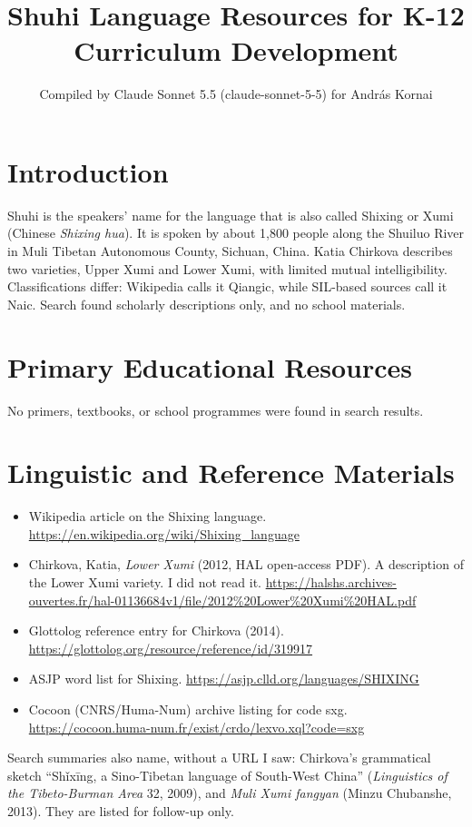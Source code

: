 \documentclass[12pt]{article}
\title{Shuhi Language Resources for K-12 Curriculum Development}
\author{Compiled by Claude Sonnet 5.5 (claude-sonnet-5-5) for Andr\'as Kornai}
\date{}
\begin{document}
\maketitle

\section{Introduction}
Shuhi is the speakers' name for the language that is also called Shixing or Xumi (Chinese \emph{Shixing hua}). It is spoken by about 1,800 people along the Shuiluo River in Muli Tibetan Autonomous County, Sichuan, China. Katia Chirkova describes two varieties, Upper Xumi and Lower Xumi, with limited mutual intelligibility. Classifications differ: Wikipedia calls it Qiangic, while SIL-based sources call it Naic. Search found scholarly descriptions only, and no school materials.

\section{Primary Educational Resources}
No primers, textbooks, or school programmes were found in search results.

\section{Linguistic and Reference Materials}
\begin{itemize}
\item Wikipedia article on the Shixing language. \url{https://en.wikipedia.org/wiki/Shixing_language}
\item Chirkova, Katia, \emph{Lower Xumi} (2012, HAL open-access PDF). A description of the Lower Xumi variety. I did not read it. \url{https://halshs.archives-ouvertes.fr/hal-01136684v1/file/2012\%20Lower\%20Xumi\%20HAL.pdf}
\item Glottolog reference entry for Chirkova (2014). \url{https://glottolog.org/resource/reference/id/319917}
\item ASJP word list for Shixing. \url{https://asjp.clld.org/languages/SHIXING}
\item Cocoon (CNRS/Huma-Num) archive listing for code sxg. \url{https://cocoon.huma-num.fr/exist/crdo/lexvo.xql?code=sxg}
\end{itemize}
Search summaries also name, without a URL I saw: Chirkova's grammatical sketch ``Sh\v{i}x\=ing, a Sino-Tibetan language of South-West China'' (\emph{Linguistics of the Tibeto-Burman Area} 32, 2009), and \emph{Muli Xumi fangyan} (Minzu Chubanshe, 2013). They are listed for follow-up only.
\end{document}
